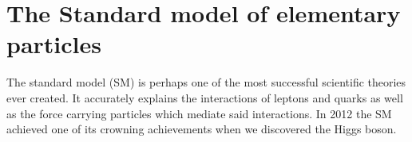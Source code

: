 \chapter{The Standard model of elementary particles}

The standard model (SM) is perhaps one of the most successful scientific theories ever
created. It accurately explains the interactions of leptons and quarks as well as the force
carrying particles which mediate said interactions. In 2012 the SM achieved one of its
crowning achievements when we discovered the Higgs boson.